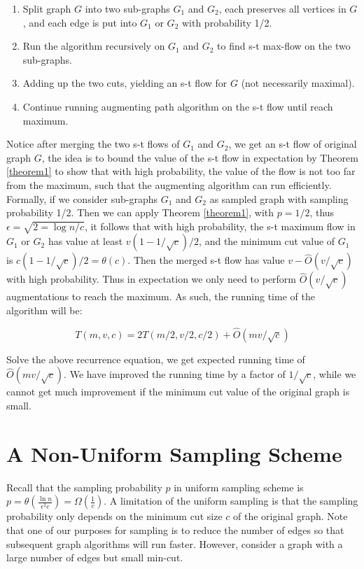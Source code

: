 \documentclass{article}
\begin{document}
\begin{enumerate}
  \item Split graph $G$ into two sub-graphs $G_1$ and $G_2$, each preserves all vertices in $G$, and each edge is put into $G_1$ or $G_2$ with probability 1/2.
  \item Run the algorithm recursively on $G_1$ and $G_2$ to find s-t max-flow on the two sub-graphs.
  \item Adding up the two cuts, yielding an s-t flow for $G$ (not necessarily maximal).
  \item Continue running augmenting path algorithm on the s-t flow until reach maximum. 
\end{enumerate}

Notice after merging the two s-t flows of $G_1$ and $G_2$, we get an s-t flow of original graph $G$, the idea is to bound the value of the s-t flow in expectation by Theorem \ref{theorem1} to show that with high probability, the value of the flow is not too far from the maximum, such that the augmenting algorithm can run efficiently.
Formally, if we consider sub-graphs $G_1$ and $G_2$ as sampled graph with sampling probability 1/2. Then we can apply Theorem \ref{theorem1}, with $p = 1/2$, thus $\epsilon = \sqrt{2=\log n / c}$, it follows that with high probability, the s-t maximum flow in $G_1$ or $G_2$ has value at least $v(1-1/\sqrt{c})/2$, and the minimum cut value of $G_1$ is $c(1-1/\sqrt{c})/2 = \theta(c)$. Then the merged s-t flow has value $v - \hat{O}(v/\sqrt{c})$ with high probability. Thus in expectation we only need to perform $\hat{O}(v/\sqrt{c})$ augmentations to reach the maximum. As such, the running time of the algorithm will be:

\begin{equation}
T(m, v, c) = 2T(m/2, v/2, c/2) + \hat{O}(mv/\sqrt{c})
\end{equation}

Solve the above recurrence equation, we get expected running time of $\hat{O}(mv/\sqrt{c})$. We have improved the running time by a factor of $1/\sqrt{c}$, while we cannot get much improvement if the minimum cut value of the original graph is small.

\section{A Non-Uniform Sampling Scheme}
Recall that the sampling probability $p$ in uniform sampling scheme is $p = \theta (\frac{\ln{n}}{\epsilon^2c}) = \Omega(\frac{1}{c})$. A limitation of the uniform sampling is that the sampling probability only depends on the minimum cut size $c$ of the original graph. 
Note that one of our purposes for sampling is to reduce the number of edges so that subsequent graph algorithms will run faster.
However, consider a graph with a large number of edges but small min-cut.
\end{document}
